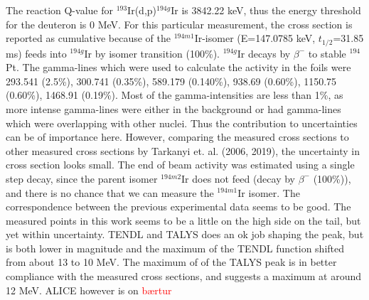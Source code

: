 \subsubsection{}
The reaction Q-value for $^{193}$Ir(d,p)$^{194g}$Ir is 3842.22 keV, thus the energy threshold for the deuteron is 0 MeV. For this particular measurement, the cross section is reported as cumulative because of the $^{194m1}$Ir-isomer (E=147.0785 keV, $t_{1/2}$=31.85 ms) feeds into $^{194g}$Ir by isomer transition (100\%). $^{194g}$Ir decays by $\beta^-$ to stable $^{194}$Pt. The gamma-lines which were used to calculate the activity in the foils were 293.541 (2.5\%), 300.741 (0.35\%), 589.179 (0.140\%), 938.69 (0.60\%), 1150.75 (0.60\%), 1468.91 (0.19\%). Most of the gamma-intensities are less than 1\%, as more intense gamma-lines were either in the background or had gamma-lines which were overlapping with other nuclei. Thus the contribution to uncertainties can be of importance here. However, comparing the measured cross sections to other measured cross sections by Tarkanyi et. al. (2006, 2019), the uncertainty in cross section looks small. The end of beam activity was estimated using a single step decay, since the parent isomer $^{194m2}$Ir does not feed (decay by $\beta^-$ (100\%)), and there is no chance that we can measure the $^{194m1}$Ir isomer. The correspondence between the previous experimental data seems to be good. The measured points in this work seems to be a little on the high side on the tail, but yet within uncertainty. TENDL and TALYS does an ok job shaping the peak, but is both lower in magnitude and the maximum of the TENDL function shifted from about 13 to 10 MeV. The maximum of of the TALYS peak is in better compliance with the measured cross sections, and suggests a maximum at around 12 MeV. ALICE however is on \textcolor{red}{bærtur}

